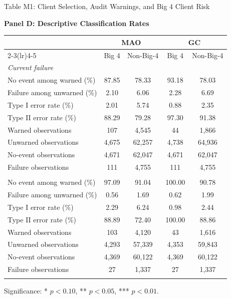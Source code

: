 \documentclass[10pt]{article}
\begin{document}
\begin{minipage}{19cm}\fontsize{10}{12}\selectfont\setlength{\tabcolsep}{4pt}\renewcommand{\arraystretch}{1.15}

\begin{center} Table M1: Client Selection, Audit Warnings, and Big 4 Client Risk\end{center}
\noindent\textbf{Panel D: Descriptive Classification Rates}\par\medskip
\begin{center}\begin{tabular*}{\textwidth}{@{\extracolsep{\fill}}lcccc@{}}
\toprule
 & \multicolumn{2}{c}{MAO} & \multicolumn{2}{c}{GC} \\
\cmidrule(lr){2-3}\cmidrule(lr){4-5}
 & Big 4 & Non-Big-4 & Big 4 & Non-Big-4 \\
\midrule
\multicolumn{5}{l}{\textit{Current failure}} \\
No event among warned (\%) & 87.85 & 78.33 & 93.18 & 78.03 \\
Failure among unwarned (\%) & 2.10 & 6.06 & 2.28 & 6.69 \\
Type I error rate (\%) & 2.01 & 5.74 & 0.88 & 2.35 \\
Type II error rate (\%) & 88.29 & 79.28 & 97.30 & 91.38 \\
Warned observations & 107 & 4,545 & 44 & 1,866 \\
Unwarned observations & 4,675 & 62,257 & 4,738 & 64,936 \\
No-event observations & 4,671 & 62,047 & 4,671 & 62,047 \\
Failure observations & 111 & 4,755 & 111 & 4,755 \\
\addlinespace
\multicolumn{5}{l}{\textit{Next-year violation announcement}} \\
No event among warned (\%) & 97.09 & 91.04 & 100.00 & 90.78 \\
Failure among unwarned (\%) & 0.56 & 1.69 & 0.62 & 1.99 \\
Type I error rate (\%) & 2.29 & 6.24 & 0.98 & 2.44 \\
Type II error rate (\%) & 88.89 & 72.40 & 100.00 & 88.86 \\
Warned observations & 103 & 4,120 & 43 & 1,616 \\
Unwarned observations & 4,293 & 57,339 & 4,353 & 59,843 \\
No-event observations & 4,369 & 60,122 & 4,369 & 60,122 \\
Failure observations & 27 & 1,337 & 27 & 1,337 \\
\addlinespace
\bottomrule\end{tabular*}\end{center}

\par\smallskip\raggedright\fontsize{9}{11}\selectfont Significance: * $p<0.10$, ** $p<0.05$, *** $p<0.01$.
\end{minipage}
\end{document}
